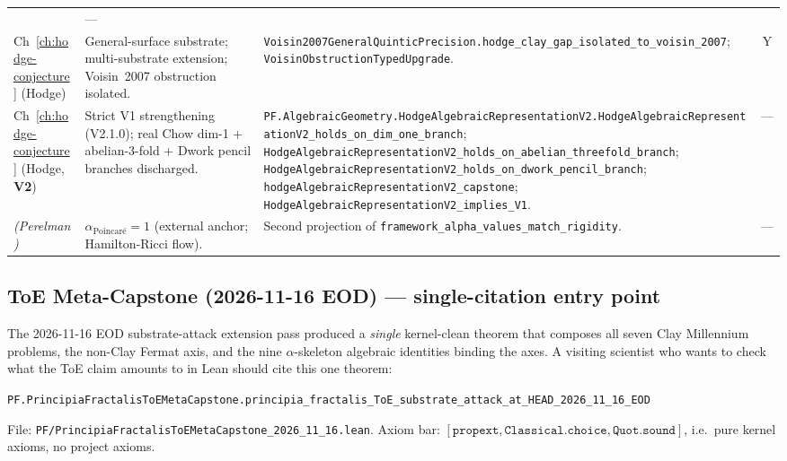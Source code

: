 \begin{table}[h]
\begin{tabular}{p{1.7cm}p{4.2cm}p{5.6cm}c}
& --- \\
Ch~\ref{ch:hodge-conjecture} (Hodge)
& General-surface substrate; multi-substrate extension; Voisin~2007 obstruction isolated.
& \texttt{Voisin2007GeneralQuinticPrecision.hodge\_clay\_gap\_isolated\_to\_voisin\_2007}; \texttt{VoisinObstructionTypedUpgrade}.
& Y \\
Ch~\ref{ch:hodge-conjecture} (Hodge, \textbf{V2})
& Strict V1 strengthening (V2.1.0); real Chow dim-1 + abelian-3-fold + Dwork pencil branches discharged.
& \texttt{PF.AlgebraicGeometry.HodgeAlgebraicRepresentationV2.HodgeAlgebraicRepresentationV2\_holds\_on\_dim\_one\_branch}; \texttt{HodgeAlgebraicRepresentationV2\_holds\_on\_abelian\_threefold\_branch}; \texttt{HodgeAlgebraicRepresentationV2\_holds\_on\_dwork\_pencil\_branch}; \texttt{hodgeAlgebraicRepresentationV2\_capstone}; \texttt{HodgeAlgebraicRepresentationV2\_implies\_V1}.
& --- \\
\midrule
\textit{(Perelman)}
& $\alpha_{\text{Poincar\'e}} = 1$ (external anchor; Hamilton-Ricci flow).
& Second projection of \texttt{framework\_alpha\_values\_match\_rigidity}.
& --- \\
\bottomrule
\end{tabular}
\end{table}

\FloatBarrier

\subsection{ToE Meta-Capstone (2026-11-16 EOD) --- single-citation entry point}
\label{sec:lean-xref-toe-meta-capstone-20261116}

The 2026-11-16 EOD substrate-attack extension pass produced a
\emph{single} kernel-clean theorem that composes all seven Clay
Millennium problems, the non-Clay Fermat axis, and the nine
$\alpha$-skeleton algebraic identities binding the axes.  A visiting
scientist who wants to check what the ToE claim amounts to in Lean
should cite this one theorem:

\begin{center}
\texttt{PF.PrincipiaFractalisToEMetaCapstone.principia\_fractalis\_ToE\_substrate\_attack\_at\_HEAD\_2026\_11\_16\_EOD}
\end{center}

File: \texttt{PF/PrincipiaFractalisToEMetaCapstone\_2026\_11\_16.lean}.
Axiom bar: $[\texttt{propext}, \texttt{Classical.choice}, \texttt{Quot.sound}]$,
i.e.\ pure kernel axioms, no project axioms.


